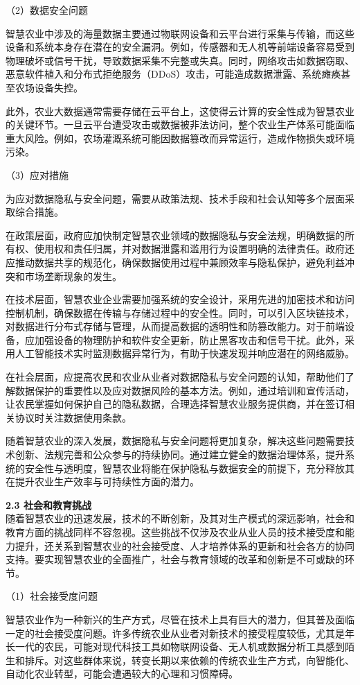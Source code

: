 （2）数据安全问题

智慧农业中涉及的海量数据主要通过物联网设备和云平台进行采集与传输，而这些设备和系统本身存在潜在的安全漏洞。例如，传感器和无人机等前端设备容易受到物理破坏或信号干扰，导致数据采集不完整或失真。同时，网络攻击如数据窃取、恶意软件植入和分布式拒绝服务（DDoS）攻击，可能造成数据泄露、系统瘫痪甚至农场设备失控。

此外，农业大数据通常需要存储在云平台上，这使得云计算的安全性成为智慧农业的关键环节。一旦云平台遭受攻击或数据被非法访问，整个农业生产体系可能面临重大风险。例如，农场灌溉系统可能因数据篡改而异常运行，造成作物损失或环境污染。

（3）应对措施

为应对数据隐私与安全问题，需要从政策法规、技术手段和社会认知等多个层面采取综合措施。

在政策层面，政府应加快制定智慧农业领域的数据隐私与安全法规，明确数据的所有权、使用权和责任归属，并对数据泄露和滥用行为设置明确的法律责任。政府还应推动数据共享的规范化，确保数据使用过程中兼顾效率与隐私保护，避免利益冲突和市场垄断现象的发生。

在技术层面，智慧农业企业需要加强系统的安全设计，采用先进的加密技术和访问控制机制，确保数据在传输与存储过程中的安全性。同时，可以引入区块链技术，对数据进行分布式存储与管理，从而提高数据的透明性和防篡改能力。对于前端设备，应加强设备的物理防护和软件安全更新，防止黑客攻击和信号干扰。此外，采用人工智能技术实时监测数据异常行为，有助于快速发现并响应潜在的网络威胁。

在社会层面，应提高农民和农业从业者对数据隐私与安全问题的认知，帮助他们了解数据保护的重要性以及应对数据风险的基本方法。例如，通过培训和宣传活动，让农民掌握如何保护自己的隐私数据，合理选择智慧农业服务提供商，并在签订相关协议时关注数据使用条款。

随着智慧农业的深入发展，数据隐私与安全问题将更加复杂，解决这些问题需要技术创新、法规完善和公众参与的持续协同。通过建立健全的数据治理体系，提升系统的安全性与透明度，智慧农业将能在保护隐私与数据安全的前提下，充分释放其在提升农业生产效率与可持续性方面的潜力。

\textbf{2.3 社会和教育挑战} \\
随着智慧农业的迅速发展，技术的不断创新，及其对生产模式的深远影响，社会和教育方面的挑战同样不容忽视。这些挑战不仅涉及农业从业人员的技术接受度和能力提升，还关系到智慧农业的社会接受度、人才培养体系的更新和社会各方的协同支持。要实现智慧农业的全面推广，社会与教育领域的改革和创新是不可或缺的环节。

（1）社会接受度问题

智慧农业作为一种新兴的生产方式，尽管在技术上具有巨大的潜力，但其普及面临一定的社会接受度问题。许多传统农业从业者对新技术的接受程度较低，尤其是年长一代的农民，可能对现代科技工具如物联网设备、无人机或数据分析工具感到陌生和排斥。对这些群体来说，转变长期以来依赖的传统农业生产方式，向智能化、自动化农业转型，可能会遭遇较大的心理和习惯障碍。


